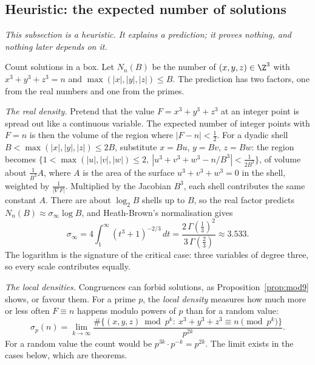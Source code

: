 \subsection*{Heuristic: the expected number of solutions}

\emph{This subsection is a heuristic. It explains a prediction; it proves nothing, and nothing later depends on it.}

Count solutions in a box. Let $N_n(B)$ be the number of $(x,y,z)\in\Z^3$ with $x^3+y^3+z^3=n$ and $\max(|x|,|y|,|z|)\le B$.
The prediction has two factors, one from the real numbers and one from the primes.

\emph{The real density.} Pretend that the value $F=x^3+y^3+z^3$ at an integer point is spread out like a continuous variable.
The expected number of integer points with $F=n$ is then the volume of the region where $|F-n|<\frac12$. For a dyadic shell
$B<\max(|x|,|y|,|z|)\le2B$, substitute $x=Bu$, $y=Bv$, $z=Bw$: the region becomes
$\{1<\max(|u|,|v|,|w|)\le2,\ |u^3+v^3+w^3-n/B^3|<\frac1{2B^3}\}$, of volume about $\frac1{B^3}A$, where $A$ is the area of the
surface $u^3+v^3+w^3=0$ in the shell, weighted by $\frac1{|\nabla F|}$. Multiplied by the Jacobian $B^3$, each shell contributes
the same constant $A$. There are about $\log_2B$ shells up to $B$, so the real factor predicts $N_n(B)\approx\sigma_\infty\log B$,
and Heath-Brown's normalisation gives
\[
\sigma_\infty=4\int_1^\infty(t^3+1)^{-2/3}\,dt=\frac{2\,\Gamma(\frac13)^2}{3\,\Gamma(\frac23)}\approx3.533.
\]
The logarithm is the signature of the critical case: three variables of degree three, so every scale contributes equally.

\emph{The local densities.} Congruences can forbid solutions, as Proposition~\ref{prop:mod9} shows, or favour them. For a
prime $p$, the \emph{local density} measures how much more or less often $F\equiv n$ happens modulo powers of $p$ than for a
random value:
\[
\sigma_p(n)=\lim_{k\to\infty}\frac{\#\{(x,y,z)\bmod p^k:\ x^3+y^3+z^3\equiv n\pmod{p^k}\}}{p^{2k}}.
\]
For a random value the count would be $p^{3k}\cdot p^{-k}=p^{2k}$. The limit exists in the cases below, which are theorems.

